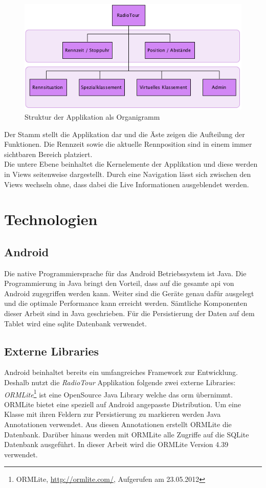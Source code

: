 \begin{figure}[h!]
\caption{Struktur der Applikation als Organigramm}
\centering
\includegraphics{05bericht/images/struktur.png}
\end{figure} 

Der Stamm stellt die Applikation dar und die Äste zeigen die Aufteilung der Funktionen. Die Rennzeit sowie die aktuelle Rennposition sind in einem immer sichtbaren Bereich platziert.
\\
Die untere Ebene beinhaltet die Kernelemente der Applikation und diese werden in Views seitenweise dargestellt. Durch eine Navigation lässt sich zwischen den Views wechseln ohne, dass dabei die Live Informationen ausgeblendet werden.


\section{Technologien}
\subsection{Android}
Die native Programmiersprache für das Android Betriebssystem ist Java. Die Programmierung in Java bringt den Vorteil, dass auf die gesamte \gls{api} von Android zugegriffen werden kann. Weiter sind die Geräte genau dafür ausgelegt und die optimale Performance kann erreicht werden. Sämtliche Komponenten dieser Arbeit sind in Java geschrieben. Für die Persistierung der Daten auf dem Tablet wird eine \gls{sqlite} Datenbank verwendet.

\subsection{Externe Libraries}
Android beinhaltet bereits ein umfangreiches Framework zur Entwicklung. Deshalb nutzt die \textit{RadioTour} Applikation folgende zwei externe Libraries:
\\
\textit{ORMLite}\footnote{ORMLite, \url{http://ormlite.com/}, Aufgerufen am 23.05.2012} ist eine OpenSource Java Library welche das \gls{orm} übernimmt. ORMLite bietet eine speziell auf Android angepasste Distribution. Um eine Klasse mit ihren Feldern zur Persistierung zu markieren werden Java Annotationen verwendet. Aus diesen Annotationen erstellt ORMLite die Datenbank. Darüber hinaus werden mit ORMLite alle Zugriffe auf die SQLite Datenbank ausgeführt. In dieser Arbeit wird die ORMLite Version 4.39 verwendet.
\\

